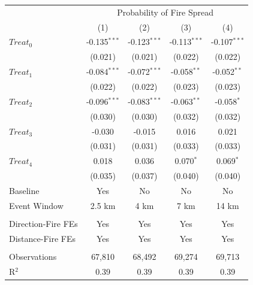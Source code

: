 \begingroup
\centering
\begin{tabular}{lcccc}
   \toprule
    & \multicolumn{4}{c}{Probability of Fire Spread}\\
                      & (1)            & (2)            & (3)            & (4)\\  
   \midrule 
   $Treat_0$          & -0.135$^{***}$ & -0.123$^{***}$ & -0.113$^{***}$ & -0.107$^{***}$\\   
                      & (0.021)        & (0.021)        & (0.022)        & (0.022)\\   
   $Treat_1$          & -0.084$^{***}$ & -0.072$^{***}$ & -0.058$^{**}$  & -0.052$^{**}$\\   
                      & (0.022)        & (0.022)        & (0.023)        & (0.023)\\   
   $Treat_2$          & -0.096$^{***}$ & -0.083$^{***}$ & -0.063$^{**}$  & -0.058$^{*}$\\   
                      & (0.030)        & (0.030)        & (0.032)        & (0.032)\\   
   $Treat_3$          & -0.030         & -0.015         & 0.016          & 0.021\\   
                      & (0.031)        & (0.031)        & (0.033)        & (0.033)\\   
   $Treat_4$          & 0.018          & 0.036          & 0.070$^{*}$    & 0.069$^{*}$\\   
                      & (0.035)        & (0.037)        & (0.040)        & (0.040)\\   
   Baseline           & Yes            & No             & No             & No\\  
   Event Window       & 2.5 km         & 4 km           & 7 km           & 14 km\\  
    \\
   Direction-Fire FEs & Yes            & Yes            & Yes            & Yes\\  
   Distance-Fire FEs  & Yes            & Yes            & Yes            & Yes\\  
    \\
   Observations       & 67,810         & 68,492         & 69,274         & 69,713\\  
   R$^2$              & 0.39           & 0.39           & 0.39           & 0.39\\  
   \bottomrule
\end{tabular}
\par\endgroup
